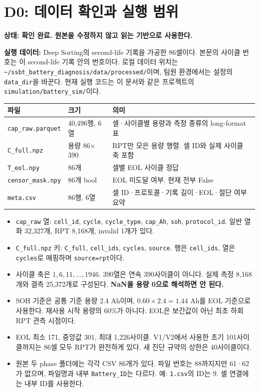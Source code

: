 \documentclass[11pt,a4paper]{article}
\newcommand{\file}[1]{{\small\nolinkurl{#1}}}
\newcommand{\state}[1]{\textbf{상태: #1}}
\begin{document}
\clearpage
\section{D0: 데이터 확인과 실행 범위}
\state{확인 완료. 원본을 수정하지 않고 읽는 기반으로 사용한다.}

\textbf{실행 데이터:} Deep Sorting의 second-life 기록을 가공한 86셀이다. 본문의 사이클 번호는 이 second-life 기록 안의 번호이다. 로컬 데이터 위치는 \file{~/ssbt_battery_diagnosis/data/processed/}이며, 팀원 환경에서는 설정의 \file{data_dir}을 바꾼다. 현재 실행 코드는 이 문서와 같은 프로젝트의 \file{simulation/battery_sim/}이다.

\begin{tabular}{p{.29\linewidth}p{.18\linewidth}p{.43\linewidth}}
\toprule
파일 & 크기 & 의미 \\
\midrule
\file{cap_raw.parquet} & 40,496행, 6열 & 셀·사이클별 용량과 측정 종류의 long-format 표 \\
\file{C_full.npz} & 용량 86$\times$390 & RPT만 모은 용량 행렬. 셀 ID와 실제 사이클 축 포함 \\
\file{T_eol.npy} & 86개 & 셀별 EOL 사이클 정답 \\
\file{censor_mask.npy} & 86개 bool & EOL 미도달 여부. 현재 전부 False \\
\file{meta.csv} & 86행, 6열 & 셀 ID·프로토콜·기록 길이·EOL·절단 여부 요약 \\
\bottomrule
\end{tabular}

\begin{itemize}
\item \file{cap_raw} 열: \file{cell_id}, \file{cycle}, \file{cycle_type}, \file{cap_Ah}, \file{soh}, \file{protocol_id}. 일반 열화 32,327개, RPT 8,168개, invalid 1개가 있다.
\item \file{C_full.npz} 키: \file{C_full}, \file{cell_ids}, \file{cycles}, \file{source}. 행은 \file{cell_ids}, 열은 \file{cycles}로 매핑하며 \file{source=rpt}이다.
\item 사이클 축은 $1,6,11,\ldots,1946$. 390열은 연속 390사이클이 아니다. 실제 측정 8,168개와 결측 25,372개로 구성된다. \textbf{NaN을 용량 0으로 해석하면 안 된다.}
\item SOH 기준은 공통 기준 용량 2.4 Ah이며, $0.60\times2.4=1.44$ Ah를 EOL 기준으로 사용한다. 재사용 시작 용량의 60\%가 아니다. EOL은 보간값이 아닌 최초 하회 RPT 관측 시점이다.
\item EOL 최소 171, 중앙값 301, 최대 1,226사이클. V1/V2에서 사용한 초기 101사이클까지는 86셀 모두 RPT가 완전하게 있다. 새 진단 규약의 상한은 40사이클이다.
\item 원본 두 phase 폴더에는 각각 CSV 86개가 있다. 파일 번호는 88까지지만 61·62가 없으며, 파일명과 내부 \file{Battery_ID}는 다르다. 예: \file{1.csv}의 ID는 9. 셀 연결에는 내부 ID를 사용한다.
\end{itemize}
\end{document}
